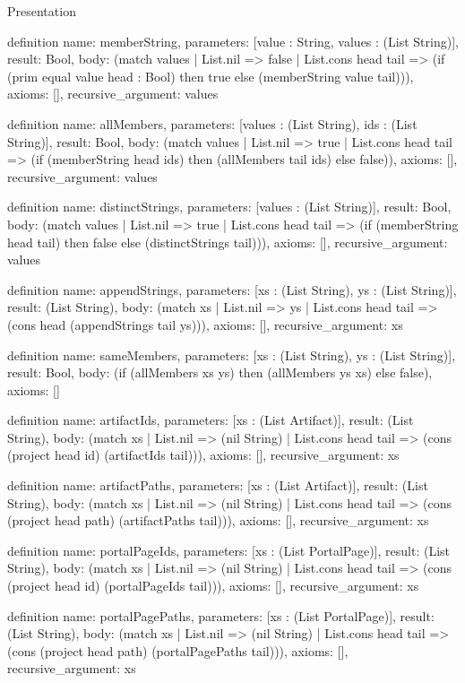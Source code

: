 \begin{lexlean}{Presentation}
\begin{semanticmodule}
definition{
  name: memberString,
  parameters: [value : String, values : (List String)],
  result: Bool,
  body: (match values
    | List.nil => false
    | List.cons head tail => (if (prim equal value head : Bool) then true else (memberString value tail))),
  axioms: [],
  recursive_argument: values
}

definition{
  name: allMembers,
  parameters: [values : (List String), ids : (List String)],
  result: Bool,
  body: (match values
    | List.nil => true
    | List.cons head tail => (if (memberString head ids) then (allMembers tail ids) else false)),
  axioms: [],
  recursive_argument: values
}

definition{
  name: distinctStrings,
  parameters: [values : (List String)],
  result: Bool,
  body: (match values
    | List.nil => true
    | List.cons head tail => (if (memberString head tail) then false else (distinctStrings tail))),
  axioms: [],
  recursive_argument: values
}

definition{
  name: appendStrings,
  parameters: [xs : (List String), ys : (List String)],
  result: (List String),
  body: (match xs | List.nil => ys | List.cons head tail => (cons head (appendStrings tail ys))),
  axioms: [],
  recursive_argument: xs
}

definition{
  name: sameMembers,
  parameters: [xs : (List String), ys : (List String)],
  result: Bool,
  body: (if (allMembers xs ys) then (allMembers ys xs) else false),
  axioms: []
}

definition{
  name: artifactIds,
  parameters: [xs : (List Artifact)],
  result: (List String),
  body: (match xs
    | List.nil => (nil String)
    | List.cons head tail => (cons (project head id) (artifactIds tail))),
  axioms: [],
  recursive_argument: xs
}

definition{
  name: artifactPaths,
  parameters: [xs : (List Artifact)],
  result: (List String),
  body: (match xs
    | List.nil => (nil String)
    | List.cons head tail => (cons (project head path) (artifactPaths tail))),
  axioms: [],
  recursive_argument: xs
}

definition{
  name: portalPageIds,
  parameters: [xs : (List PortalPage)],
  result: (List String),
  body: (match xs
    | List.nil => (nil String)
    | List.cons head tail => (cons (project head id) (portalPageIds tail))),
  axioms: [],
  recursive_argument: xs
}

definition{
  name: portalPagePaths,
  parameters: [xs : (List PortalPage)],
  result: (List String),
  body: (match xs
    | List.nil => (nil String)
    | List.cons head tail => (cons (project head path) (portalPagePaths tail))),
  axioms: [],
  recursive_argument: xs
}


\end{semanticmodule}
\end{lexlean}
